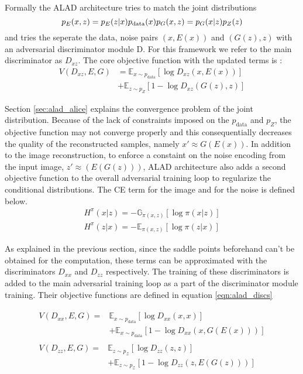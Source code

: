 Formally the ALAD architecture tries to match the joint distributions 
\begin{equation}
    p_{E} (x, z) = p_{E}(z | x) p_{\text{data}}(x) \\[5pt]
    p_{G} (x, z) = p_{G}(x | z) p_{Z}(z)
\end{equation}
and tries the seperate the data, noise pairs $(x, E(x))$ and $(G(z), z)$ with an adversarial
discriminator module D. For this framework we refer to the main discriminator as $D_{xz}$. The core
objective function with the updated terms is :
\begin{equation}
\begin{aligned} V\left(D_{x z}, E, G\right) &=\mathbb{E}_{x \sim p_{\text{data}}}\left[\log D_{x z}(x, E(x))\right] \\ &+\mathbb{E}_{z \sim p_{Z}}\left[1-\log D_{x z}(G(z), z)\right]
 \end{aligned}
\end{equation}

Section \ref{sec:alad_alice} explains the convergence problem of the joint distribution. Because of
the lack of constraints imposed on the $p_{\text{data}}$ and $p_{Z}$, the objective function may not
converge properly and this consequentially decreases the quality of the reconstructed samples,
namely $x' \approx G(E(x))$. In addition to the image reconstruction, to enforce a constaint on the
noise encoding from the input image, $z' \approx (E(G(z)))$, ALAD architecture also adds a second
objective function to the overall adversarial training loop to regularize the conditional
distributions. The CE term for the image and for the noise is defined below.
\begin{align}
    H^{\pi}(x | z)=-\mathbb{G}_{\pi(x, z)}[\log \pi(x | z)] \\[5pt]
    H^{\pi}(z | x)=-\mathbb{E}_{\pi(x, z)}[\log \pi(z | x)] 
\end{align}

As explained in the previous section, since the saddle points beforehand can't be obtained for the
computation, these terms can be approximated with the discriminators $D_{xx}$ and $D_{zz}$
respectively. The training of these discriminators is added to the main adversarial training loop as
a part of the discriminator module training. Their objective functions are defined in equation
\ref{eqn:alad_discs}

\begin{align}
    \label{eqn:alad_discs}
\begin{split} V\left(D_{x x}, E, G\right) ={}&\mathbb{E}_{x \sim p_{\text{data}}}\left[\log D_{x x}(x, x)\right] \\ &+\mathbb{E}_{x \sim p_{\text{data}}}\left[1-\log D_{x x}(x, G(E(x)))\right] \end{split}  \\[5pt]
\begin{split} V\left(D_{z z}, E, G\right) ={}&\mathbb{E}_{z \sim p_{\mathcal{Z}}}\left[\log D_{z z}(z, z)\right] \\ &+\mathbb{E}_{z \sim p_{\mathcal{Z}}}\left[1-\log D_{z z}(z, E(G(z)))\right] \end{split}    
\end{align}

